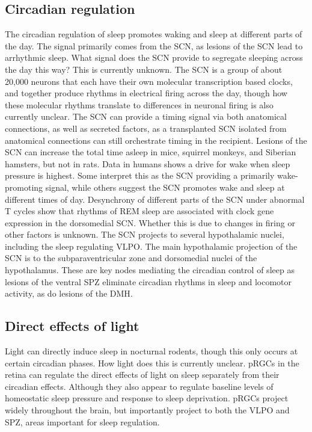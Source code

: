 \subsection{Circadian regulation}
The circadian regulation of sleep promotes waking and sleep at 
different parts of the day.
The signal primarily comes from the SCN,
as lesions of the SCN lead to arrhythmic sleep\cite{trachsel_sleep_1992}.
What signal does the SCN provide to segregate sleeping 
across the day this way? 
This is currently unknown. 
The SCN is a group of about 20,000 neurons that each have their
own molecular transcription based clocks, and together produce
rhythms in electrical firing across the day\cite{herzog_regulating_2017,
coomans_detrimental_2013},
though how these molecular rhythms translate to differences in neuronal 
firing is also currently unclear\cite{colwell_linking_2011}.
The SCN can provide a timing signal via both anatomical connections, 
as well as secreted factors, as a transplanted SCN isolated
from anatomical connections can still orchestrate timing in the 
recipient\cite{silver_diffusible_1996}.
Lesions of the SCN can increase the total time asleep in mice, 
squirrel monkeys, and Siberian 
hamsters\cite{easton_suprachiasmatic_2004, edgar_effect_1993, 
larkin_homeostatic_2004}, but not in rats\cite{trachsel_sleep_1992}.
Data in humans shows a drive for wake when sleep pressure is 
highest\cite{dijk_paradoxical_1994}.
Some interpret this as the SCN providing a primarily 
wake-promoting signal, while others suggest the SCN
promotes wake and sleep at different times of day\cite{
mistlberger_circadian_2005, scammell_neural_2017}.
Desynchrony of different parts of the SCN under abnormal T cycles 
show that rhythms of REM sleep are associated with clock
gene expression in the dorsomedial SCN\cite{lee_circadian_2009}.
Whether this is due to changes in firing or other factors is 
unknown. 
The SCN projects to several hypothalamic nuclei, including the sleep
regulating VLPO\cite{watts_efferent_1987, sollars_neurobiology_2015}.
The main hypothalamic projection of the SCN is to the 
subparaventricular zone and dorsomedial nuclei of the hypothalamus.
These are key nodes mediating the circadian control of sleep 
as lesions of the ventral SPZ eliminate circadian rhythms in 
sleep and locomotor activity\cite{lu_contrasting_2001}, 
as do lesions of the DMH\cite{chou_critical_2003}.

\subsection{Direct effects of light}
Light can directly induce sleep in nocturnal rodents\cite{lupi_acute_2008},
though this only occurs at certain circadian phases\cite{muindi_acute_2013}.
How light does this is currently unclear. 
pRGCs in the retina can regulate the direct effects of light on 
sleep separately from their circadian effects\cite{rupp_distinct_2019}.
Although they also appear to regulate baseline levels of 
homeostatic sleep pressure and response to sleep 
deprivation\cite{tsai_melanopsin_2009}.
pRGCs project widely throughout the brain, but importantly
project to both the VLPO and SPZ, areas important 
for sleep regulation\cite{muindi_retino-hypothalamic_2014, 
lu_contrasting_2001}.

